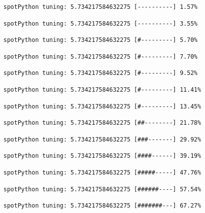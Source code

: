 \documentclass[
  letterpaper,
  DIV=11,
  numbers=noendperiod]{scrreprt}
\begin{document}
\begin{verbatim}
spotPython tuning: 5.734217584632275 [----------] 1.57% 
\end{verbatim}

\begin{verbatim}
spotPython tuning: 5.734217584632275 [----------] 3.55% 
\end{verbatim}

\begin{verbatim}
spotPython tuning: 5.734217584632275 [#---------] 5.70% 
\end{verbatim}

\begin{verbatim}
spotPython tuning: 5.734217584632275 [#---------] 7.70% 
\end{verbatim}

\begin{verbatim}
spotPython tuning: 5.734217584632275 [#---------] 9.52% 
\end{verbatim}

\begin{verbatim}
spotPython tuning: 5.734217584632275 [#---------] 11.41% 
\end{verbatim}

\begin{verbatim}
spotPython tuning: 5.734217584632275 [#---------] 13.45% 
\end{verbatim}

\begin{verbatim}
spotPython tuning: 5.734217584632275 [##--------] 21.78% 
\end{verbatim}

\begin{verbatim}
spotPython tuning: 5.734217584632275 [###-------] 29.92% 
\end{verbatim}

\begin{verbatim}
spotPython tuning: 5.734217584632275 [####------] 39.19% 
\end{verbatim}

\begin{verbatim}
spotPython tuning: 5.734217584632275 [#####-----] 47.76% 
\end{verbatim}

\begin{verbatim}
spotPython tuning: 5.734217584632275 [######----] 57.54% 
\end{verbatim}

\begin{verbatim}
spotPython tuning: 5.734217584632275 [#######---] 67.27% 
\end{verbatim}
\end{document}
